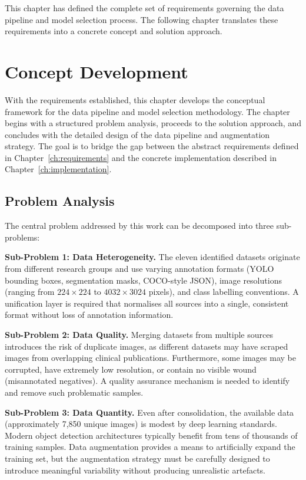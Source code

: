 \documentclass[a4paper,12pt,twoside]{report}
\begin{document}
This chapter has defined the complete set of requirements governing the data
pipeline and model selection process. The following chapter translates these
requirements into a concrete concept and solution approach.

\chapter{Concept Development}
\label{ch:concept}

With the requirements established, this chapter develops the conceptual
framework for the data pipeline and model selection methodology. The chapter
begins with a structured problem analysis, proceeds to the solution approach,
and concludes with the detailed design of the data pipeline and augmentation
strategy. The goal is to bridge the gap between the abstract requirements
defined in Chapter~\ref{ch:requirements} and the concrete implementation
described in Chapter~\ref{ch:implementation}.

\section{Problem Analysis}
\label{sec:problem-analysis}

The central problem addressed by this work can be decomposed into three
sub-problems:

\textbf{Sub-Problem 1: Data Heterogeneity.}
The eleven identified datasets originate from different research groups and use
varying annotation formats (YOLO bounding boxes, segmentation masks, COCO-style
JSON), image resolutions (ranging from $224 \times 224$ to $4032 \times 3024$
pixels), and class labelling conventions. A unification layer is required that
normalises all sources into a single, consistent format without loss of
annotation information.

\textbf{Sub-Problem 2: Data Quality.}
Merging datasets from multiple sources introduces the risk of duplicate images,
as different datasets may have scraped images from overlapping clinical
publications. Furthermore, some images may be corrupted, have extremely low
resolution, or contain no visible wound (misannotated negatives). A quality
assurance mechanism is needed to identify and remove such problematic samples.

\textbf{Sub-Problem 3: Data Quantity.}
Even after consolidation, the available data (approximately 7,850 unique images)
is modest by deep learning standards. Modern object detection architectures
typically benefit from tens of thousands of training samples. Data augmentation
provides a means to artificially expand the training set, but the augmentation
strategy must be carefully designed to introduce meaningful variability without
producing unrealistic artefacts.
\end{document}
